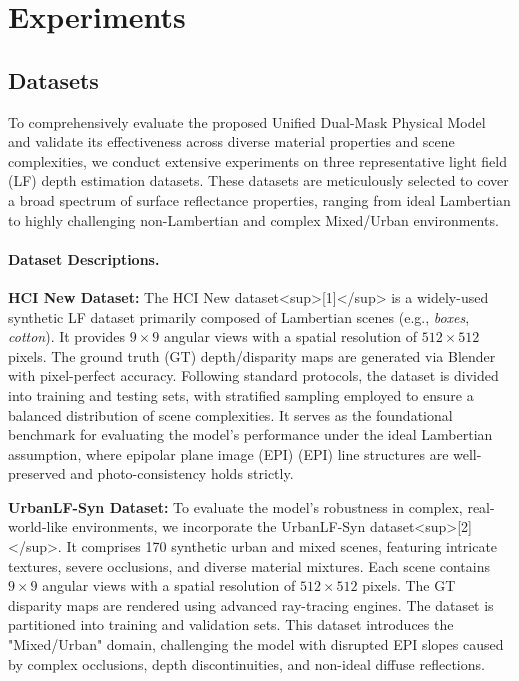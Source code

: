 \section{Experiments}

\subsection{Datasets}

To comprehensively evaluate the proposed Unified Dual-Mask Physical Model and validate its effectiveness across diverse material properties and scene complexities, we conduct extensive experiments on three representative light field (LF) depth estimation datasets. These datasets are meticulously selected to cover a broad spectrum of surface reflectance properties, ranging from ideal Lambertian to highly challenging non-Lambertian and complex Mixed/Urban environments.

\paragraph{Dataset Descriptions.}

\textbf{HCI New Dataset:} The HCI New dataset<sup>[1]</sup> is a widely-used synthetic LF dataset primarily composed of Lambertian scenes (e.g., \textit{boxes}, \textit{cotton}). It provides $9 \times 9$ angular views with a spatial resolution of $512 \times 512$ pixels. The ground truth (GT) depth/disparity maps are generated via Blender with pixel-perfect accuracy. Following standard protocols, the dataset is divided into training and testing sets, with stratified sampling employed to ensure a balanced distribution of scene complexities. It serves as the foundational benchmark for evaluating the model's performance under the ideal Lambertian assumption, where epipolar plane image (EPI) (EPI) line structures are well-preserved and photo-consistency holds strictly.

\textbf{UrbanLF-Syn Dataset:} To evaluate the model's robustness in complex, real-world-like environments, we incorporate the UrbanLF-Syn dataset<sup>[2]</sup>. It comprises 170 synthetic urban and mixed scenes, featuring intricate textures, severe occlusions, and diverse material mixtures. Each scene contains $9 \times 9$ angular views with a spatial resolution of $512 \times 512$ pixels. The GT disparity maps are rendered using advanced ray-tracing engines. The dataset is partitioned into training and validation sets. This dataset introduces the "Mixed/Urban" domain, challenging the model with disrupted EPI slopes caused by complex occlusions, depth discontinuities, and non-ideal diffuse reflections.

